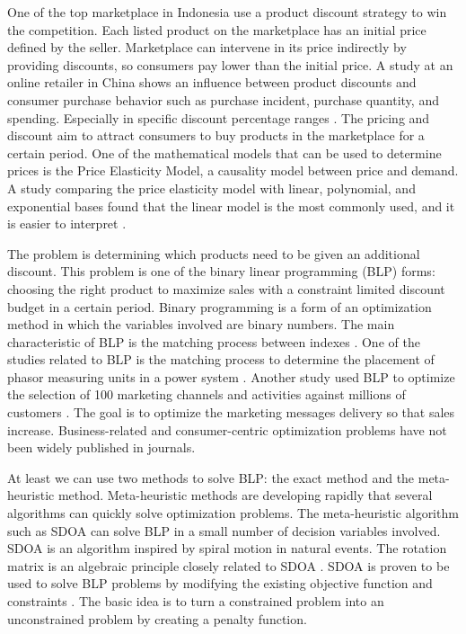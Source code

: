 \documentclass[preprint, 3p,
authoryear]{elsarticle} %
\begin{document}
One of the top marketplace in Indonesia use a product discount strategy
to win the competition. Each listed product on the marketplace has an
initial price defined by the seller. Marketplace can intervene in its
price indirectly by providing discounts, so consumers pay lower than the
initial price. A study at an online retailer in China shows an influence
between product discounts and consumer purchase behavior such as
purchase incident, purchase quantity, and spending. Especially in
specific discount percentage ranges \citep{cny}. The pricing and
discount aim to attract consumers to buy products in the marketplace for
a certain period. One of the mathematical models that can be used to
determine prices is the Price Elasticity Model, a causality model
between price and demand. A study comparing the price elasticity model
with linear, polynomial, and exponential bases found that the linear
model is the most commonly used, and it is easier to interpret
\citep{linear_reg}.

The problem is determining which products need to be given an additional
discount. This problem is one of the binary linear programming (BLP)
forms: choosing the right product to maximize sales with a constraint
limited discount budget in a certain period. Binary programming is a
form of an optimization method in which the variables involved are
binary numbers. The main characteristic of BLP is the matching process
between indexes \citep{lieberman}. One of the studies related to BLP is
the matching process to determine the placement of phasor measuring
units in a power system \citep{suresh}. Another study used BLP to
optimize the selection of 100 marketing channels and activities against
millions of customers \citep{ieee}. The goal is to optimize the
marketing messages delivery so that sales increase. Business-related and
consumer-centric optimization problems have not been widely published in
journals.

At least we can use two methods to solve BLP: the exact method and the
meta-heuristic method. Meta-heuristic methods are developing rapidly
that several algorithms can quickly solve optimization problems. The
meta-heuristic algorithm such as SDOA can solve BLP in a small number of
decision variables involved. SDOA is an algorithm inspired by spiral
motion in natural events. The rotation matrix is an algebraic principle
closely related to SDOA \citep{tamura}. SDOA is proven to be used to
solve BLP problems by modifying the existing objective function and
constraints \citep{kun}. The basic idea is to turn a constrained problem
into an unconstrained problem by creating a penalty function.
\end{document}
